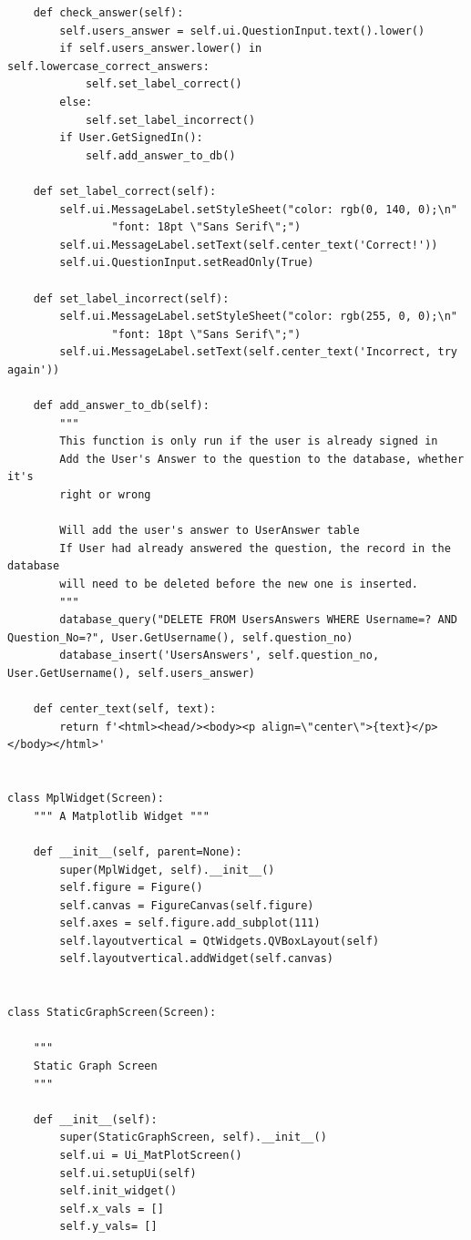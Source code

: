 \documentclass[12pt]{article}
\begin{document}
\begin{lstlisting}
    def check_answer(self):
        self.users_answer = self.ui.QuestionInput.text().lower()
        if self.users_answer.lower() in self.lowercase_correct_answers:
            self.set_label_correct()
        else:
            self.set_label_incorrect()
        if User.GetSignedIn():
            self.add_answer_to_db()

    def set_label_correct(self):
        self.ui.MessageLabel.setStyleSheet("color: rgb(0, 140, 0);\n"
                "font: 18pt \"Sans Serif\";")
        self.ui.MessageLabel.setText(self.center_text('Correct!'))
        self.ui.QuestionInput.setReadOnly(True)

    def set_label_incorrect(self):
        self.ui.MessageLabel.setStyleSheet("color: rgb(255, 0, 0);\n"
                "font: 18pt \"Sans Serif\";")
        self.ui.MessageLabel.setText(self.center_text('Incorrect, try again'))

    def add_answer_to_db(self):
        """
        This function is only run if the user is already signed in
        Add the User's Answer to the question to the database, whether it's
        right or wrong

        Will add the user's answer to UserAnswer table
        If User had already answered the question, the record in the database
        will need to be deleted before the new one is inserted.
        """
        database_query("DELETE FROM UsersAnswers WHERE Username=? AND Question_No=?", User.GetUsername(), self.question_no)
        database_insert('UsersAnswers', self.question_no, User.GetUsername(), self.users_answer)

    def center_text(self, text):
        return f'<html><head/><body><p align=\"center\">{text}</p></body></html>'


class MplWidget(Screen):
    """ A Matplotlib Widget """

    def __init__(self, parent=None):
        super(MplWidget, self).__init__()
        self.figure = Figure()
        self.canvas = FigureCanvas(self.figure)
        self.axes = self.figure.add_subplot(111)
        self.layoutvertical = QtWidgets.QVBoxLayout(self)
        self.layoutvertical.addWidget(self.canvas)


class StaticGraphScreen(Screen):

    """
    Static Graph Screen
    """

    def __init__(self):
        super(StaticGraphScreen, self).__init__()
        self.ui = Ui_MatPlotScreen()
        self.ui.setupUi(self)
        self.init_widget()
        self.x_vals = []
        self.y_vals= []


\end{lstlisting}
\end{document}
